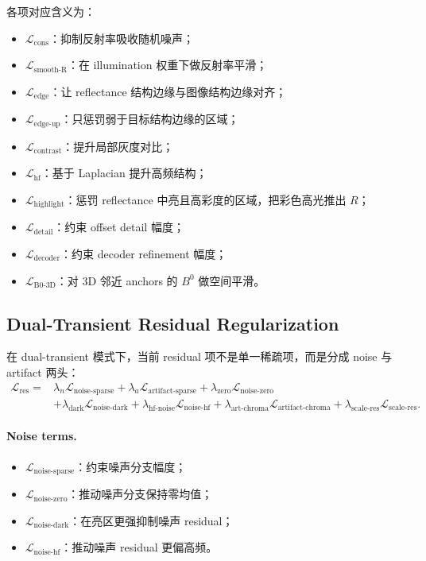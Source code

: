 \documentclass[11pt]{article}
\begin{document}
各项对应含义为：
\begin{itemize}[leftmargin=1.5em]
    \item $\mathcal{L}_{\text{cons}}$：抑制反射率吸收随机噪声；
    \item $\mathcal{L}_{\text{smooth-R}}$：在 illumination 权重下做反射率平滑；
    \item $\mathcal{L}_{\text{edge}}$：让 reflectance 结构边缘与图像结构边缘对齐；
    \item $\mathcal{L}_{\text{edge-up}}$：只惩罚弱于目标结构边缘的区域；
    \item $\mathcal{L}_{\text{contrast}}$：提升局部灰度对比；
    \item $\mathcal{L}_{\text{hf}}$：基于 Laplacian 提升高频结构；
    \item $\mathcal{L}_{\text{highlight}}$：惩罚 reflectance 中亮且高彩度的区域，把彩色高光推出 $R$；
    \item $\mathcal{L}_{\text{detail}}$：约束 offset detail 幅度；
    \item $\mathcal{L}_{\text{decoder}}$：约束 decoder refinement 幅度；
    \item $\mathcal{L}_{\text{B0-3D}}$：对 3D 邻近 anchors 的 $B^0$ 做空间平滑。
\end{itemize}

\subsection{Dual-Transient Residual Regularization}

在 dual-transient 模式下，当前 residual 项不是单一稀疏项，而是分成 noise 与 artifact 两头：
\begin{align}
    \mathcal{L}_{\text{res}}
    ={}&
    \lambda_n \mathcal{L}_{\text{noise-sparse}}
    +
    \lambda_a \mathcal{L}_{\text{artifact-sparse}}
    +
    \lambda_{\text{zero}} \mathcal{L}_{\text{noise-zero}}
    \nonumber \\
    &+
    \lambda_{\text{dark}} \mathcal{L}_{\text{noise-dark}}
    +
    \lambda_{\text{hf-noise}} \mathcal{L}_{\text{noise-hf}}
    +
    \lambda_{\text{art-chroma}} \mathcal{L}_{\text{artifact-chroma}}
    +
    \lambda_{\text{scale-res}} \mathcal{L}_{\text{scale-res}}.
\end{align}

\paragraph{Noise terms.}
\begin{itemize}[leftmargin=1.5em]
    \item $\mathcal{L}_{\text{noise-sparse}}$：约束噪声分支幅度；
    \item $\mathcal{L}_{\text{noise-zero}}$：推动噪声分支保持零均值；
    \item $\mathcal{L}_{\text{noise-dark}}$：在亮区更强抑制噪声 residual；
    \item $\mathcal{L}_{\text{noise-hf}}$：推动噪声 residual 更偏高频。
\end{itemize}
\end{document}
